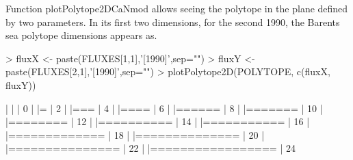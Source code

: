 \documentclass{article}
\begin{document}
Function plotPolytope2DCaNmod allows seeing the polytope in the plane defined by two parameters. In its first two dimensions, for the second 1990, the Barents sea polytope dimensions appears as. 

\begin{Schunk}
\begin{Sinput}
> fluxX <- paste(FLUXES[1,1],'[1990]',sep="")
> fluxY <- paste(FLUXES[2,1],'[1990]',sep="")
> plotPolytope2D(POLYTOPE, c(fluxX, fluxY))
\end{Sinput}
\begin{Soutput}
  |                                                                            
  |                                                                      |   0%
  |                                                                            
  |=                                                                     |   2%
  |                                                                            
  |===                                                                   |   4%
  |                                                                            
  |====                                                                  |   6%
  |                                                                            
  |======                                                                |   8%
  |                                                                            
  |=======                                                               |  10%
  |                                                                            
  |========                                                              |  12%
  |                                                                            
  |==========                                                            |  14%
  |                                                                            
  |===========                                                           |  16%
  |                                                                            
  |=============                                                         |  18%
  |                                                                            
  |==============                                                        |  20%
  |                                                                            
  |===============                                                       |  22%
  |                                                                            
  |=================                                                     |  24%

\end{Soutput}
\end{Schunk}
\end{document}
